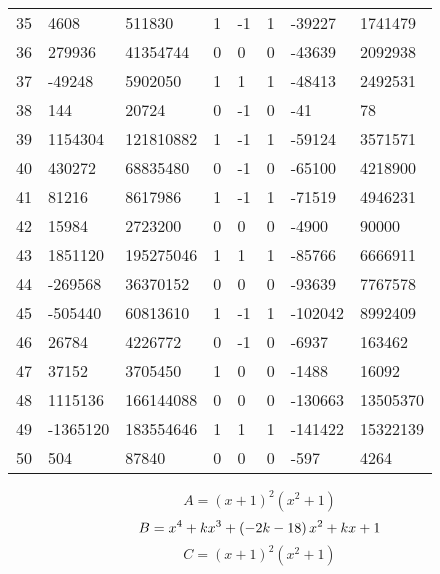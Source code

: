 \documentclass{amsart}
\begin{document}
\begin{longtable}{|l|l|l|lllll|}
35&4608&511830&1&-1&1&-39227&1741479\\
36&279936&41354744&0&0&0&-43639&2092938\\
37&-49248&5902050&1&1&1&-48413&2492531\\
38&144&20724&0&-1&0&-41&78\\
39&1154304&121810882&1&-1&1&-59124&3571571\\
40&430272&68835480&0&-1&0&-65100&4218900\\
41&81216&8617986&1&-1&1&-71519&4946231\\
42&15984&2723200&0&0&0&-4900&90000\\
43&1851120&195275046&1&1&1&-85766&6666911\\
44&-269568&36370152&0&0&0&-93639&7767578\\
45&-505440&60813610&1&-1&1&-102042&8992409\\
46&26784&4226772&0&-1&0&-6937&163462\\
47&37152&3705450&1&0&0&-1488&16092\\
48&1115136&166144088&0&0&0&-130663&13505370\\
49&-1365120&183554646&1&1&1&-141422&15322139\\
50&504&87840&0&0&0&-597&4264\\
\hline
\end{longtable}
$$A=(x
 + 1)^{2}(x^2
 + 1)$$
$$B=x^4
 + k\*x^3
 + \left(-2\*k
 - 18\right) \*x^2
 + k\*x
 + 1$$
$$C=(x
 + 1)^{2}(x^2
 + 1)$$
\end{document}
